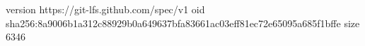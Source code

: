 version https://git-lfs.github.com/spec/v1
oid sha256:8a9006b1a312c88929b0a649637bfa83661ac03eff81ec72e65095a685f1bffe
size 6346
